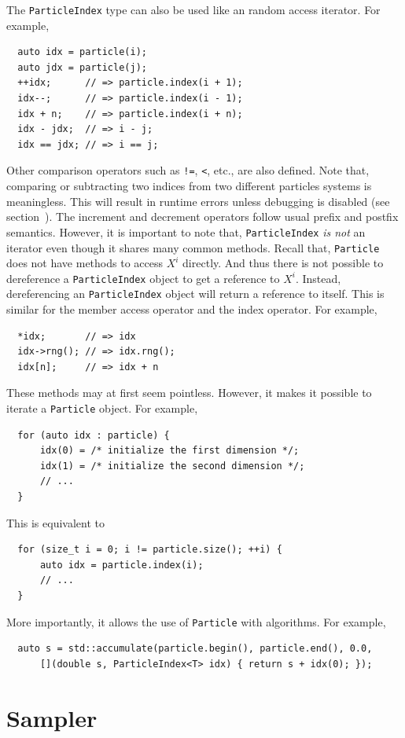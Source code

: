 The \verb|ParticleIndex| type can also be used like an random access iterator.
For example,
\begin{Verbatim}
  auto idx = particle(i);
  auto jdx = particle(j);
  ++idx;      // => particle.index(i + 1);
  idx--;      // => particle.index(i - 1);
  idx + n;    // => particle.index(i + n);
  idx - jdx;  // => i - j;
  idx == jdx; // => i == j;
\end{Verbatim}
Other comparison operators such as \verb|!=|, \verb|<|, etc., are also
defined. Note that, comparing or subtracting two indices from two different
particles systems is meaningless. This will result in runtime errors unless
debugging is disabled (see section~). The increment
and decrement operators follow usual \cpp prefix and postfix semantics.
However, it is important to note that, \verb|ParticleIndex| \emph{is not} an
iterator even though it shares many common methods. Recall that,
\verb|Particle| does not have methods to access $X^i$ directly. And thus there
is not possible to dereference a \verb|ParticleIndex| object to get a reference
to $X^i$. Instead, dereferencing an \verb|ParticleIndex| object will return a
reference to itself. This is similar for the member access operator and the
index operator. For example,
\begin{Verbatim}
  *idx;       // => idx
  idx->rng(); // => idx.rng();
  idx[n];     // => idx + n
\end{Verbatim}
These methods may at first seem pointless. However, it makes it possible to
iterate a \verb|Particle| object. For example,
\begin{Verbatim}
  for (auto idx : particle) {
      idx(0) = /* initialize the first dimension */;
      idx(1) = /* initialize the second dimension */;
      // ...
  }
\end{Verbatim}
This is equivalent to
\begin{Verbatim}
  for (size_t i = 0; i != particle.size(); ++i) {
      auto idx = particle.index(i);
      // ...
  }
\end{Verbatim}
More importantly, it allows the use of \verb|Particle| with algorithms. For
example,
\begin{Verbatim}
  auto s = std::accumulate(particle.begin(), particle.end(), 0.0,
      [](double s, ParticleIndex<T> idx) { return s + idx(0); });
\end{Verbatim}

\section{Sampler}
\label{sec:Sampler}

